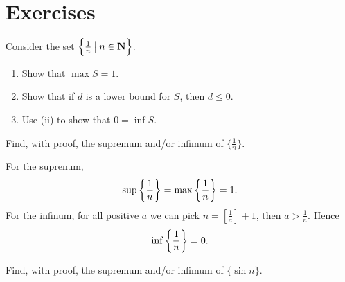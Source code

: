\section*{Exercises}
\begin{prbm}
Consider the set $\left\{\frac{1}{n}\:\big|\:n\in\mathbf N\right\}$.
\begin{enumerate}[label=(\roman*)]
\item Show that $\max S=1$.
\item Show that if $d$ is a lower bound for $S$, then $d \le 0$.
\item Use (ii) to show that $0 = \inf S$.
\end{enumerate}
\end{prbm}

\begin{prbm}
Find, with proof, the supremum and/or infimum of $\{\frac{1}{n}\}$.
\end{prbm}

\begin{solution}
For the suprenum,
\[ \sup\left\{\frac{1}{n}\right\} = \max\left\{\frac{1}{n}\right\} = 1. \]
For the infinum, for all positive $a$ we can pick $n=[\frac{1}{a}]+1$, then $a>\frac{1}{n}$. Hence 
\[ \inf\left\{\frac{1}{n}\right\}=0. \]
\end{solution}

\begin{prbm}
Find, with proof, the supremum and/or infimum of $\{\sin n\}$.
\end{prbm}

